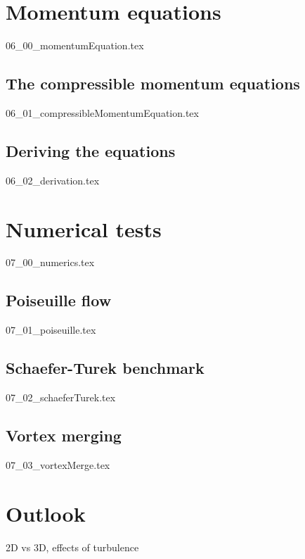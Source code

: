 \documentclass[12pt,a4paper,twoside]{article}
\begin{document}
\section{Momentum equations}
\label{sec: Momentum equations}
{06_00_momentumEquation.tex}

\subsection{The compressible momentum equations}
\label{sub: The compressible momentum equations}
{06_01_compressibleMomentumEquation.tex}

\subsection{Deriving the equations}
\label{sub: Deriving the equations}
{06_02_derivation.tex}

\section{Numerical tests}
\label{sec: Numerics}
{07_00_numerics.tex}

\subsection{Poiseuille flow}
\label{sub: Poiseuille flow}
{07_01_poiseuille.tex}

\subsection{Schaefer-Turek benchmark}
\label{sub: Schaefer-Turek benchmark}
{07_02_schaeferTurek.tex}

\subsection{Vortex merging}
\label{sub: Vortex merging}
{07_03_vortexMerge.tex}

\section{Outlook}
\label{sec: Outlook}
2D vs 3D, effects of turbulence
\end{document}
